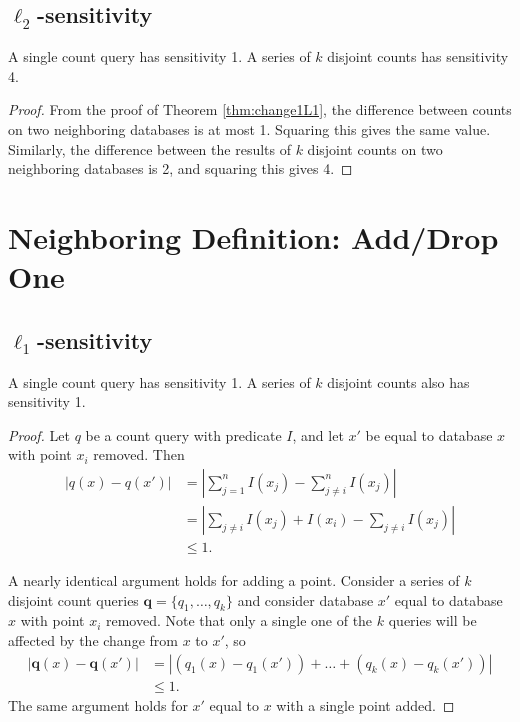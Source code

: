 \documentclass[11pt]{scrartcl} %
\begin{document}
\subsection{$\ell_2$-sensitivity}

\begin{theorem}
A single count query has sensitivity 1. A series of $k$ disjoint counts has sensitivity 4.
\end{theorem}

\begin{proof}
From the proof of Theorem \ref{thm:change1L1}, the difference between counts on two neighboring databases is at most 1. Squaring this gives the same value. Similarly, the difference between the results of $k$ disjoint counts on two neighboring databases is 2, and squaring this gives 4. 
\end{proof}

\section{Neighboring Definition: Add/Drop One}
\subsection{$\ell_1$-sensitivity}
\begin{theorem}
\label{thm:addDropL1}
A single count query has sensitivity 1. A series of $k$ disjoint counts also has sensitivity 1.
\end{theorem}

\begin{proof}
Let $q$ be a count query with predicate $I$, and let $x'$ be equal to database $x$ with point $x_i$ removed. Then 
\begin{align*}
\left \vert q(x) - q(x') \right\vert &= \left\vert \sum_{j=1}^n I(x_j) - \sum_{j\ne i}^n I(x_j) \right\vert\\
	&= \left\vert \sum_{j \ne i} I(x_j) + I(x_i) - \sum_{j\ne i} I(x_j) \right\vert\\
	&\le 1.
\end{align*}

A nearly identical argument holds for adding a point. 
Consider a series of $k$ disjoint count queries $\mathbf{q} = \{q_1, \ldots, q_k\}$ and consider database $x'$ equal to database $x$ with point $x_i$ removed. Note that only a single one of the $k$ queries will be affected by the change from $x$ to $x'$, so
\begin{align*}
\left\vert \mathbf{q}(x) - \mathbf{q}(x') \right\vert &= \left\vert \left(q_1(x) - q_1(x')\right) + \ldots + \left(q_k(x) - q_k(x')\right) \right\vert \\
	&\le 1.
\end{align*}
The same argument holds for $x'$ equal to $x$ with a single point added.
\end{proof}
\end{document}

